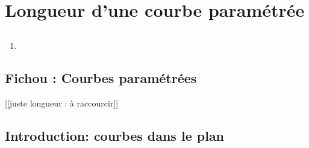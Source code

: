 \documentclass[12pt, class=report,crop=false]{standalone}
\begin{document}

\newcommand{\ou}{\mathscr{O}}
\newcommand{\f}{\mathscr{F}}
\newcommand{\mat}{\mathscr{M}}
\newcommand{\co}{\mathscr{C}}




\section{Longueur d'une courbe paramétrée}

\subsection{}


\subsection{}


\subsection{}


\subsection{}
 
 
\begin{miniexercices}
\sauteligne
\begin{enumerate}
  \item 
\end{enumerate}
\end{miniexercices}

\subsection{Fichou : Courbes paramétrées}

[[juste longueur : à raccourcir]]

\subsection{Introduction: courbes dans le plan}
\end{document}
